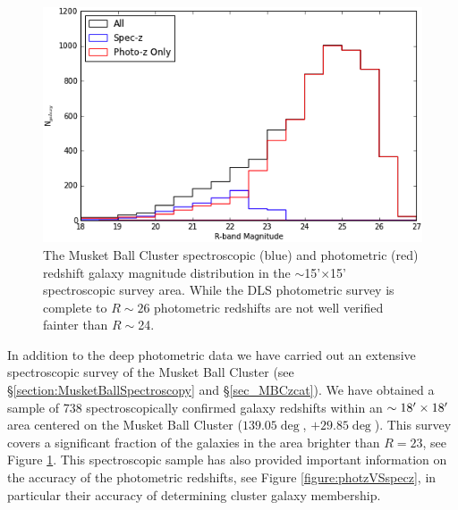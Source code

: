 \begin{figure}
	\centering
	\includegraphics[width=5in]{Chapter4/AnalysisFiles/magdist.png}
	\caption[Musket Ball Cluster spectroscopic and photometric magnitude distribution.]{
	The Musket Ball Cluster spectroscopic (blue) and photometric (red) redshift galaxy magnitude distribution in the $\sim$15'$\times$15' spectroscopic survey area.
	While the DLS photometric survey is complete to $R\sim26$ photometric redshifts are not well verified fainter than $R\sim$24.
		}
	\label{figure:PhotozSpeczMagDist}
\end{figure}

In addition to the deep photometric data we have carried out an extensive spectroscopic survey of the Musket Ball Cluster (see \S\ref{section:MusketBallSpectroscopy} and \S\ref{sec_MBCzcat}).
We have obtained a sample of 738 spectroscopically confirmed galaxy redshifts within an $\sim 18\mbox{$^\prime$} \times 18\mbox{$^\prime$}$ area centered on the Musket Ball Cluster ($139.05\deg$, $+29.85\deg$).
This survey covers a significant fraction of the galaxies in the area brighter than $R=23$, see Figure \ref{figure:PhotozSpeczMagDist}.
This spectroscopic sample has also provided important information on the accuracy of the photometric redshifts, see Figure \ref{figure:photzVSspecz}, in particular their accuracy of determining cluster galaxy membership.

